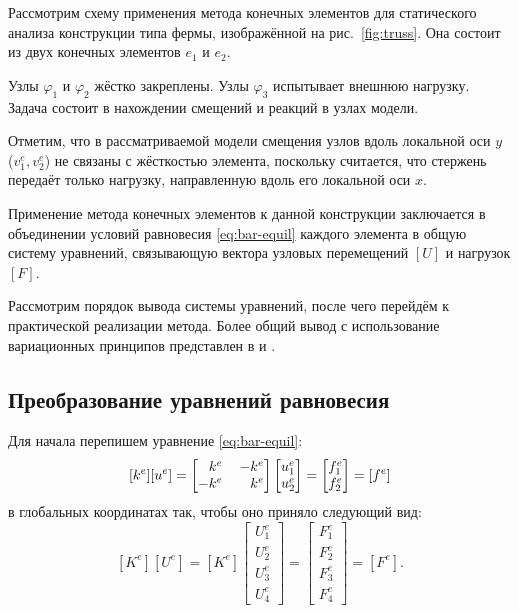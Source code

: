 \documentclass[10pt]{article}
\numberwithin{equation}{section}
\renewcommand{\phi}{\varphi}
\newcommand{\matr}[1]{[#1]}
\newcommand{\figref}[1]{рис. \ref{#1}}
\newcommand{\node}[1]{$\phi_{#1}$}
\newcommand{\element}[1]{$e_{#1}$}
\newcommand{\mm}{\llap{$-$}}
\newcommand{\phm}{\phantom{-}}
\begin{document}
Рассмотрим схему применения метода конечных элементов для статического
анализа конструкции типа фермы, изображённой на \figref{fig:truss}.
Она состоит из двух конечных элементов \element{1} и \element{2}.



Узлы \node{1} и \node{2} жёстко закреплены. Узлы \node{3} испытывает
внешнюю нагрузку. Задача состоит в нахождении смещений и реакций в
узлах модели.

Отметим, что в рассматриваемой модели смещения узлов вдоль локальной
оси $y$ ($v_1^e, v_2^e$) не связаны с жёсткостью элемента, поскольку
считается, что стержень передаёт только нагрузку, направленную вдоль
его локальной оси $x$.

Применение метода конечных элементов к данной конструкции заключается
в объединении условий равновесия \eqref{eq:bar-equil} каждого элемента
в общую систему уравнений, связывающую вектора узловых перемещений
$\matr{U}$ и нагрузок $\matr{F}$.

Рассмотрим порядок вывода системы уравнений, после чего перейдём к
практической реализации метода. Более общий вывод с использование
вариационных принципов представлен в \cite{bathe96} и
\cite{zienkiewicz00}.

\subsection{Преобразование уравнений равновесия}

Для начала перепишем уравнение \eqref{eq:bar-equil}:
\begin{equation}
  \label{eq:bar-element-equil}
  \matr{k^e}\matr{u^e}=
  \begin{bmatrix}
    \phm{}k^e&& \mm k^e\\
    -k^e && k^e    
  \end{bmatrix}
  \begin{bmatrix}
    u_1^e\\
    u_2^e
  \end{bmatrix}
  =
  \begin{bmatrix}
    f_1^e\\
    f_2^e
  \end{bmatrix}=\matr{f^e}
\end{equation}
в глобальных координатах так, чтобы оно приняло следующий вид:
\begin{equation}
  \label{eq:target-equil}
  \matr{K^e}\matr{U^e}=\matr{K^e}
  \begin{bmatrix}
    U_1^e\\
    U_2^e\\
    U_3^e\\
    U_4^e
  \end{bmatrix}
  =
  \begin{bmatrix}
    F_1^e\\
    F_2^e\\
    F_3^e\\
    F_4^e
  \end{bmatrix}=\matr{F^e}.
\end{equation}
\end{document}

